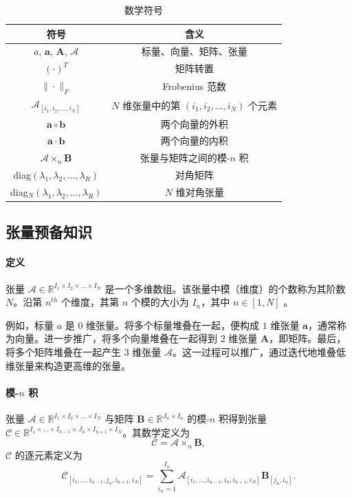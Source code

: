 \documentclass[conference]{IEEEtran}
\begin{document}
\begin{table}[htbp]
\scriptsize
  \caption{数学符号}
  \label{math_notation}
  \centering
  \begin{tabular}{cc}
    \toprule
      符号   & 含义 \\
    \midrule
    $a$, $\mathbf{a}$, $\mathbf{A}$, $\mathcal{A}$    & 标量、向量、矩阵、张量  \\
    $(\cdot)^T$ & 矩阵转置 \\
    $\|\cdot\|_F$ & Frobenius 范数 \\
    $\mathcal{A}_{[i_1, i_2, \dots, i_N]}$ & $N$ 维张量中的第 $(i_1, i_2, \dots, i_N)$ 个元素 \\
    $\mathbf{a} \circ \mathbf{b}$ & 两个向量的外积 \\
    $\mathbf{a} \cdot \mathbf{b}$ & 两个向量的内积 \\
    $\mathcal{A} \times_n \mathbf{B}$ & 张量与矩阵之间的模-$n$ 积 \\
    diag$\left(\lambda_1, \lambda_2, \dots, \lambda_R \right)$ & 对角矩阵  \\
    diag$_N \left(\lambda_1, \lambda_2, \dots, \lambda_R \right)$ & $N$ 维对角张量 \\
    \bottomrule
  \end{tabular}
\end{table}


\subsection{张量预备知识}

\paragraph{定义} 张量 $\mathcal{A} \in \mathbb{R}^{I_1 \times I_2 \times \dots \times I_N}$ 是一个多维数组。该张量中模（维度）的个数称为其阶数 $N$。沿第 $n^{th}$ 个维度，其第 $n$ 个模的大小为 $I_n$，其中 $n \in [1, N]$ \cite{kolda2009tensor}。

例如，标量 $a$ 是 $0$ 维张量。将多个标量堆叠在一起，便构成 $1$ 维张量 $\mathbf{a}$，通常称为向量。进一步推广，将多个向量堆叠在一起得到 $2$ 维张量 $\mathbf{A}$，即矩阵。最后，将多个矩阵堆叠在一起产生 $3$ 维张量 $\mathcal{A}$。这一过程可以推广，通过迭代地堆叠低维张量来构造更高维的张量。

\paragraph{模-$n$ 积} 张量 $\mathcal{A} \in \mathbb{R}^{I_1 \times I_2 \times \dots \times I_N}$ 与矩阵 $\mathbf{B} \in \mathbb{R}^{J_n \times I_n}$ 的模-$n$ 积得到张量 $\mathcal{C} \in \mathbb{R}^{I_1 \times \dots \times I_{n-1} \times J_n \times I_{n+1} \times I_N}$。其数学定义为
\begin{equation}
    \mathcal{C} = \mathcal{A} \times_n \mathbf{B},
\label{eq:mode_n_product}
\end{equation}
$\mathcal{C}$ 的逐元素定义为
\begin{equation}
    \mathcal{C}_{[i_1,\dots,i_{n-1}, j_n, i_{n+1}, i_N]} = \sum_{i_n=1}^{I_n} \mathcal{A}_{[i_1,\dots,i_{n-1}, i_n, i_{n+1}, i_N]} \mathbf{B}_{[j_n, i_n]}.
\label{eq:mode_n_product_index_notation}
\end{equation}
\end{document}
